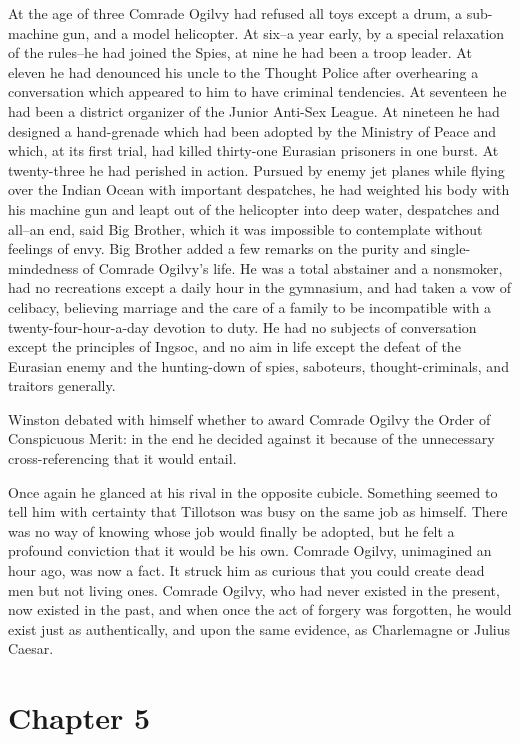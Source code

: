 \documentclass{article}
\begin{document}
At the age of three Comrade Ogilvy had refused all toys except a drum, a
sub-machine gun, and a model helicopter. At six--a year early, by a special
relaxation of the rules--he had joined the Spies, at nine he had been a
troop leader. At eleven he had denounced his uncle to the Thought Police
after overhearing a conversation which appeared to him to have criminal
tendencies. At seventeen he had been a district organizer of the Junior
Anti-Sex League. At nineteen he had designed a hand-grenade which had
been adopted by the Ministry of Peace and which, at its first trial, had
killed thirty-one Eurasian prisoners in one burst. At twenty-three he had
perished in action. Pursued by enemy jet planes while flying over the
Indian Ocean with important despatches, he had weighted his body with his
machine gun and leapt out of the helicopter into deep water, despatches
and all--an end, said Big Brother, which it was impossible to contemplate
without feelings of envy. Big Brother added a few remarks on the purity
and single-mindedness of Comrade Ogilvy's life. He was a total abstainer
and a nonsmoker, had no recreations except a daily hour in the gymnasium,
and had taken a vow of celibacy, believing marriage and the care of a
family to be incompatible with a twenty-four-hour-a-day devotion to duty.
He had no subjects of conversation except the principles of Ingsoc, and
no aim in life except the defeat of the Eurasian enemy and the hunting-down
of spies, saboteurs, thought-criminals, and traitors generally.

Winston debated with himself whether to award Comrade Ogilvy the Order of
Conspicuous Merit: in the end he decided against it because of the
unnecessary cross-referencing that it would entail.

Once again he glanced at his rival in the opposite cubicle. Something
seemed to tell him with certainty that Tillotson was busy on the same job
as himself. There was no way of knowing whose job would finally be adopted,
but he felt a profound conviction that it would be his own. Comrade Ogilvy,
unimagined an hour ago, was now a fact. It struck him as curious that you
could create dead men but not living ones. Comrade Ogilvy, who had never
existed in the present, now existed in the past, and when once the act of
forgery was forgotten, he would exist just as authentically, and upon the
same evidence, as Charlemagne or Julius Caesar.




\section{Chapter 5}
\end{document}

